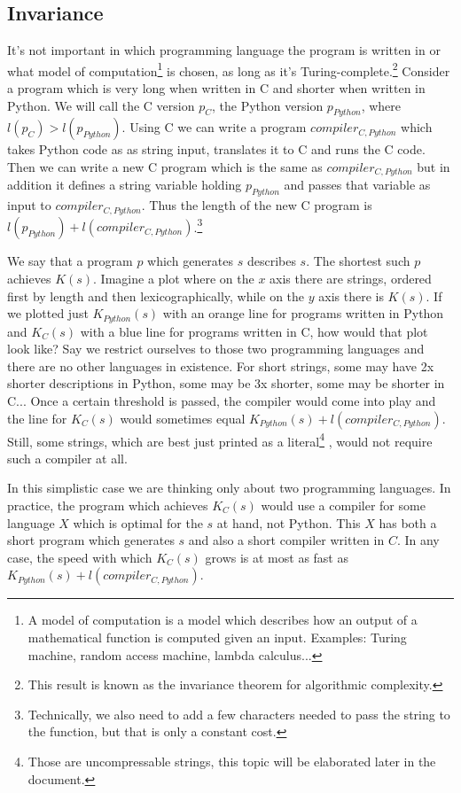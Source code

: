 \documentclass[oneside,hidelinks]{article}
\begin{document}
\newpage

\subsection{Invariance}

It's not important in which programming language the program is written in or what model of computation\footnote{
A model of computation is a model which describes how an output of a mathematical function is computed given an input.
Examples: Turing machine, random access machine, lambda calculus...
}
is chosen, as long as it's Turing-complete.\footnote{
This result is known as the invariance theorem for algorithmic complexity.
}
Consider a program which is very long when written in C and shorter when written in Python.
We will call the C version $p_C$, the Python version $p_{Python}$, where $l(p_C) > l(p_{Python})$.
Using C we can write a program $compiler_{C,Python}$ which takes Python code as as string input, translates it to C and runs the C code.
Then we can write a new C program which is the same as $compiler_{C,Python}$ but in addition it defines a string variable holding $p_{Python}$ and passes that variable as input to $compiler_{C,Python}$.
Thus the length of the new C program is $l(p_{Python}) + l(compiler_{C,Python})$.\footnote{
Technically, we also need to add a few characters needed to pass the string to the function, but that is only a constant cost.
}

We say that a program $p$ which generates $s$ describes $s$.
The shortest such $p$ achieves $K(s)$.
Imagine a plot where on the $x$ axis there are strings, ordered first by length and then lexicographically, while on the $y$ axis there is $K(s)$.
If we plotted just $K_{Python}(s)$ with an orange line for programs written in Python and $K_C(s)$ with a blue line for programs written in C, how would that plot look like?
Say we restrict ourselves to those two programming languages and there are no other languages in existence.
For short strings, some may have 2x shorter descriptions in Python, some may be 3x shorter, some may be shorter in C...
Once a certain threshold is passed, the compiler would come into play and the line for $K_C(s)$ would sometimes equal $K_{Python}(s) + l(compiler_{C,Python})$.
Still, some strings, which are best just printed as a literal\footnote{
Those are uncompressable strings, this topic will be elaborated later in the document.
}
, would not require such a compiler at all.

In this simplistic case we are thinking only about two programming languages.
In practice, the program which achieves $K_C(s)$ would use a compiler for some language $X$ which is optimal for the $s$ at hand, not Python.
This $X$ has both a short program which generates $s$ and also a short compiler written in $C$.
In any case, the speed with which $K_C(s)$ grows is at most as fast as $K_{Python}(s) + l(compiler_{C,Python})$.
\end{document}
